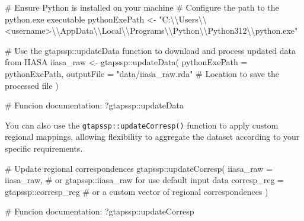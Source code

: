 \documentclass[
  letterpaper,
  DIV=11,
  numbers=noendperiod]{scrartcl}
\newenvironment{Shaded}{}{}
\newcommand{\AttributeTok}[1]{\textcolor[rgb]{0.00,0.34,0.68}{#1}}
\newcommand{\CommentTok}[1]{\textcolor[rgb]{0.54,0.53,0.53}{#1}}
\newcommand{\FunctionTok}[1]{\textcolor[rgb]{0.39,0.29,0.61}{#1}}
\newcommand{\NormalTok}[1]{\textcolor[rgb]{0.12,0.11,0.11}{#1}}
\newcommand{\OtherTok}[1]{\textcolor[rgb]{0.00,0.43,0.16}{#1}}
\newcommand{\SpecialCharTok}[1]{\textcolor[rgb]{0.24,0.68,0.91}{#1}}
\newcommand{\StringTok}[1]{\textcolor[rgb]{0.75,0.01,0.01}{#1}}
\begin{document}
\begin{Shaded}
\begin{Highlighting}[]
\CommentTok{\# Ensure Python is installed on your machine}
\CommentTok{\# Configure the path to the python.exe executable}
\NormalTok{pythonExePath }\OtherTok{\textless{}{-}} \StringTok{"C:}\SpecialCharTok{\textbackslash{}\textbackslash{}}\StringTok{Users}\SpecialCharTok{\textbackslash{}\textbackslash{}}\StringTok{\textless{}username\textgreater{}}\SpecialCharTok{\textbackslash{}\textbackslash{}}\StringTok{AppData}\SpecialCharTok{\textbackslash{}\textbackslash{}}\StringTok{Local}\SpecialCharTok{\textbackslash{}\textbackslash{}}\StringTok{Programs}\SpecialCharTok{\textbackslash{}\textbackslash{}}\StringTok{Python}\SpecialCharTok{\textbackslash{}\textbackslash{}}\StringTok{Python312}\SpecialCharTok{\textbackslash{}\textbackslash{}}\StringTok{python.exe"}

\CommentTok{\# Use the gtapssp::updateData function to download and process updated data from IIASA}
\NormalTok{iiasa\_raw }\OtherTok{\textless{}{-}}\NormalTok{ gtapssp}\SpecialCharTok{::}\FunctionTok{updateData}\NormalTok{(}
  \AttributeTok{pythonExePath =}\NormalTok{ pythonExePath,}
  \AttributeTok{outputFile =} \StringTok{"data/iiasa\_raw.rda"} \CommentTok{\# Location to save the processed file}
\NormalTok{)}

\CommentTok{\# Funcion documentation:}
\NormalTok{?gtapssp}\SpecialCharTok{::}\NormalTok{updateData}
\end{Highlighting}
\end{Shaded}

You can also use the \texttt{gtapssp::updateCorresp()} function to apply
custom regional mappings, allowing flexibility to aggregate the dataset
according to your specific requirements.

\begin{Shaded}
\begin{Highlighting}[]
\CommentTok{\# Update regional correspondences}
\NormalTok{gtapssp}\SpecialCharTok{::}\FunctionTok{updateCorresp}\NormalTok{(}
  \AttributeTok{iiasa\_raw =}\NormalTok{ iiasa\_raw, }\CommentTok{\# or gtapssp::iiasa\_raw for use default input data}
  \AttributeTok{corresp\_reg =}\NormalTok{ gtapssp}\SpecialCharTok{::}\NormalTok{corresp\_reg }\CommentTok{\# or a custom vector of regional correspondences}
\NormalTok{)}

\CommentTok{\# Funcion documentation:}
\NormalTok{?gtapssp}\SpecialCharTok{::}\NormalTok{updateCorresp}
\end{Highlighting}
\end{Shaded}
\end{document}
